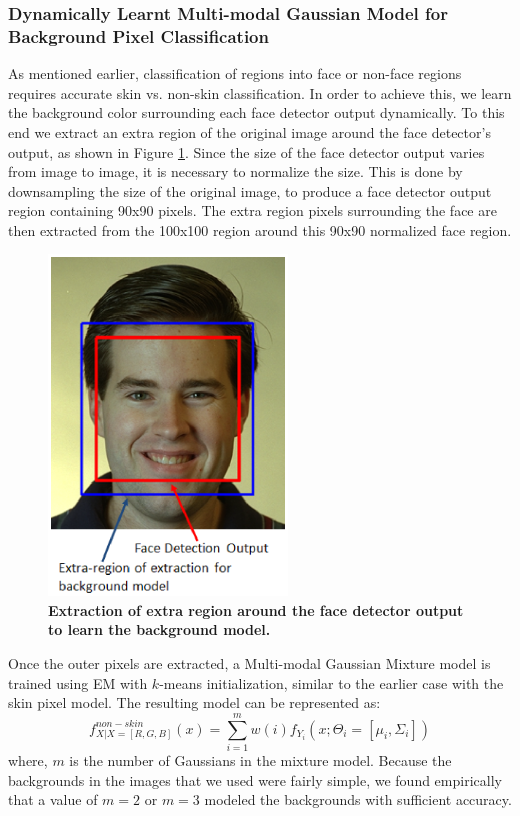 \documentclass[times, 10pt,twocolumn]{article}
\begin{document}
\subsubsection{Dynamically Learnt Multi-modal Gaussian Model for
Background Pixel Classification}\label{DynamicModel} As mentioned
earlier, classification of regions into face or
non-face regions requires accurate skin vs. non-skin classification. In
order to achieve this, we learn the background color surrounding each face
detector output dynamically. To this end we extract an extra region
of the original image around the face detector's output, as shown in
Figure \ref{Fig:Extraregion}. Since the size of the face detector output
varies from image to image, it is necessary to normalize the size.
This is done by downsampling the size of the original image, to produce
a face detector output region containing 90x90 pixels.  The extra region
pixels surrounding the face are then extracted from the 100x100 region
around this 90x90 normalized face region.
\vspace{-0.15in}
\begin{figure}[h]
\centering
\includegraphics[width=2.5in]{Figure5.eps}
\caption{{\bf {\selectfont Extraction of extra
region around the face detector output to learn the background
model.}}} \label{Fig:Extraregion}
\end{figure}

Once the outer pixels are extracted, a Multi-modal Gaussian Mixture model
is trained using EM with $k$-means initialization, similar to the
earlier case with the skin pixel model. The resulting model can be
represented as:
\begin{equation}
f^{non-skin}_{X|X=[R,G,B]}(x) =
\sum\limits_{i=1}^{m}w(i)f_{Y_i}\left(x;\Theta_i=[\mu_i,\Sigma_i]\right)
\end{equation}
where, $m$ is the number of Gaussians in the mixture model.
Because the backgrounds in the images that we used were fairly simple,
we found empirically that a value of $m=2$ or $m=3$
modeled the backgrounds with sufficient accuracy.
\end{document}
